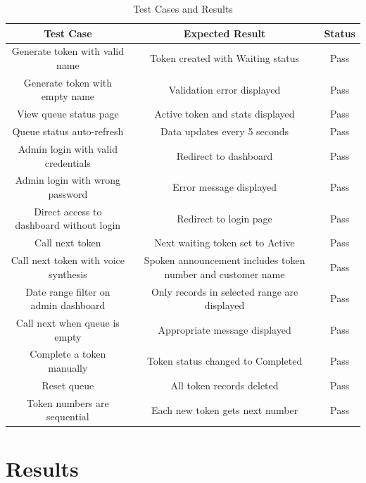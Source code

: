 \begin{table}[htbp]
    \centering
    \begin{tabular}{|c|c|c|}
        \hline
        \textbf{Test Case} & \textbf{Expected Result} & \textbf{Status} \\
        \hline
        Generate token with valid name & Token created with Waiting status & Pass \\
        \hline
        Generate token with empty name & Validation error displayed & Pass \\
        \hline
        View queue status page & Active token and stats displayed & Pass \\
        \hline
        Queue status auto-refresh & Data updates every 5 seconds & Pass \\
        \hline
        Admin login with valid credentials & Redirect to dashboard & Pass \\
        \hline
        Admin login with wrong password & Error message displayed & Pass \\
        \hline
        Direct access to dashboard without login & Redirect to login page & Pass \\
        \hline
        Call next token & Next waiting token set to Active & Pass \\
        \hline
        Call next token with voice synthesis & Spoken announcement includes token number and customer name & Pass \\
        \hline
        Date range filter on admin dashboard & Only records in selected range are displayed & Pass \\
        \hline
        Call next when queue is empty & Appropriate message displayed & Pass \\
        \hline
        Complete a token manually & Token status changed to Completed & Pass \\
        \hline
        Reset queue & All token records deleted & Pass \\
        \hline
        Token numbers are sequential & Each new token gets next number & Pass \\
        \hline
    \end{tabular}
    \caption{Test Cases and Results}
    \label{tab:testcases}
\end{table}

\section{Results}

